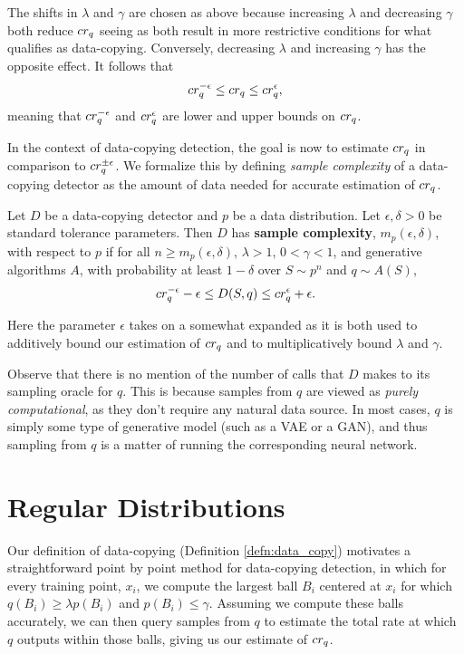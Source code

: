 The shifts in $\lambda$ and $\gamma$ are chosen as above because increasing $\lambda$ and decreasing $\gamma$ both reduce $cr_q$ seeing as both result in more restrictive conditions for what qualifies as data-copying. Conversely, decreasing $\lambda$ and increasing $\gamma$ has the opposite effect. It follows that $$cr_q^{-\epsilon} \leq cr_q \leq cr_q^{\epsilon},$$ meaning that $cr_q^{-\epsilon}$ and $cr_q^{\epsilon}$ are lower and upper bounds on $cr_q$. 

In the context of data-copying detection, the goal is now to estimate $cr_q$ in comparison to $cr_q^{\pm \epsilon}$. We formalize this by defining \textit{sample complexity} of a data-copying detector as the amount of data needed for accurate estimation of $cr_q$. 

\begin{definition}\label{def:sample_complexity}
Let $D$ be a data-copying detector and $p$ be a data distribution. Let $\epsilon, \delta > 0$ be standard tolerance parameters. Then $D$ has \textbf{sample complexity}, $m_p(\epsilon, \delta)$, with respect to $p$ if for all $n \geq m_p(\epsilon, \delta)$, $\lambda >1$, $0 < \gamma < 1$, and generative algorithms $A$, with probability at least $1 - \delta$ over $S \sim p^n$ and $q \sim A(S)$, $$cr_q^{-\epsilon} - \epsilon \leq D(S, q) \leq cr_q^{\epsilon} + \epsilon.$$
\end{definition}

Here the parameter $\epsilon$ takes on a somewhat expanded as it is both used to additively bound our estimation of $cr_q$ and to multiplicatively bound $\lambda$ and $\gamma$.

Observe that there is no mention of the number of calls that $D$ makes to its sampling oracle for $q$. This is because samples from $q$ are viewed as \textit{purely computational}, as they don't require any natural data source. In most cases, $q$ is simply some type of generative model (such as a VAE or a GAN), and thus sampling from $q$ is a matter of running the corresponding neural network.

\section{Regular Distributions}\label{sec:regular_dist}

Our definition of data-copying (Definition \ref{defn:data_copy}) motivates a straightforward point by point method for data-copying detection, in which for every training point, $x_i$, we compute the largest ball $B_i$ centered at $x_i$ for which $q(B_i) \geq \lambda p(B_i)$ and $p(B_i) \leq \gamma$. Assuming we compute these balls accurately, we can then query samples from $q$ to estimate the total rate at which $q$ outputs within those balls, giving us our estimate of $cr_q$.

